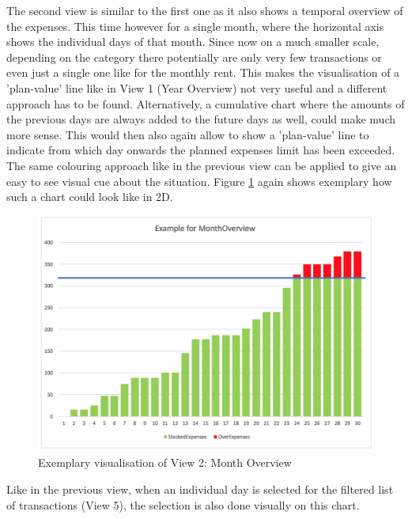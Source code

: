 The second view is similar to the first one as it also shows a temporal overview of the expenses. This time however for a single month, where the horizontal axis shows the individual days of that month. Since now on a much smaller scale, depending on the category there potentially are only very few transactions or even just a single one like for the monthly rent. This makes the visualisation of a 'plan-value' line like in View 1 (Year Overview) not very useful and a different approach has to be found. \newline
Alternatively, a cumulative chart where the amounts of the previous days are always added to the future days as well, could make much more sense. This would then also again allow to show a 'plan-value' line to indicate from which day onwards the planned expenses limit has been exceeded. The same colouring approach like in the previous view can be applied to give an easy to see visual cue about the situation. Figure \ref{fig:view2chart} again shows exemplary how such a chart could look like in 2D.
\begin{figure}[h]
	\begin{center}
		\includegraphics[width=14cm]{03_Figures/07_Suggestion/View2_MonthOverview.png}
		\caption{Exemplary visualisation of View 2: Month Overview}
		\label{fig:view2chart}
	\end{center}
\end{figure}
Like in the previous view, when an individual day is selected for the filtered list of transactions (View 5), the selection is also done visually on this chart.



